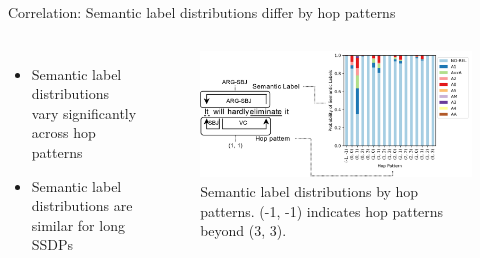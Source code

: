 \begin{block}{Correlation: Semantic label distributions differ by hop patterns}
\begin{columns}
\begin{itemize}
    \item Semantic label distributions vary significantly across hop patterns
    \item Semantic label distributions are similar for long SSDPs 
\end{itemize}
\begin{figure}
    \centering
    \includegraphics[width=\textwidth]{images/synsem-explanation-4.png}
    \vspace{-1.5\baselineskip}
    \caption{Semantic label distributions by hop patterns. (-1, -1) indicates hop patterns beyond (3, 3).}
    \label{fig:my_label}
\end{figure}
\end{columns}

\end{block}